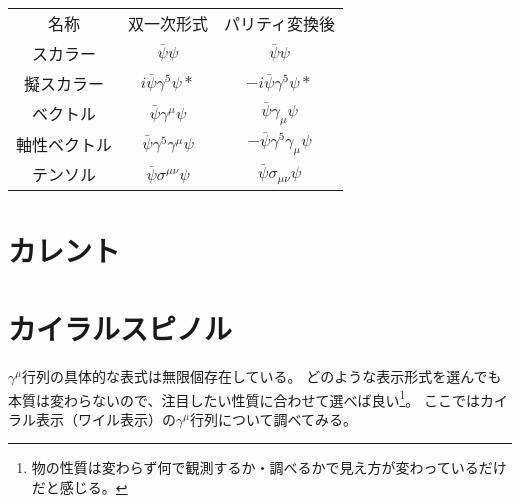 \begin{table}[]
  \centering
  \begin{tabular}{ccc}
    名称         & 双一次形式 & パリティ変換後 \\
    スカラー     & $\bar{\psi}\psi$                    & $\bar{\psi}\psi$   \\
    擬スカラー   & $i\bar{\psi}\gamma^5\psi*$          & $-i\bar{\psi}\gamma^5\psi*$         \\
    ベクトル     & $\bar{\psi}\gamma^{\mu}\psi$        & $\bar{\psi}\gamma_{\mu}\psi$    \\
    軸性ベクトル & $\bar{\psi}\gamma^5\gamma^\mu\psi$  & $-\bar{\psi}\gamma^5\gamma_\mu\psi$ \\
    テンソル     & $\bar{\psi}\sigma^{\mu\nu}\psi$     & $\bar{\psi}\sigma_{\mu\nu}\psi$   
  \end{tabular}
\end{table}

\section{カレント}

\section{カイラルスピノル}

$\gamma^{\mu}$行列の具体的な表式は無限個存在している。
どのような表示形式を選んでも本質は変わらないので、注目したい性質に合わせて選べば良い\footnote{物の性質は変わらず何で観測するか・調べるかで見え方が変わっているだけだと感じる。}。
ここではカイラル表示（ワイル表示）の$\gamma^{\mu}$行列について調べてみる。

